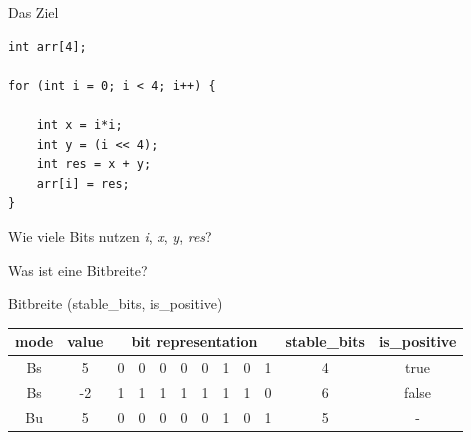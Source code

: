 
\begin{frame}[fragile]{Das Ziel}
\begin{lstlisting}
int arr[4];

for (int i = 0; i < 4; i++) {

	int x = i*i;      
	int y = (i << 4); 
	int res = x + y;  
	arr[i] = res;
}
\end{lstlisting}
Wie viele Bits nutzen \textit{i}, \textit{x}, \textit{y}, \textit{res}? \newline
\end{frame}

\begin{frame}{Was ist eine Bitbreite?}
\begin{center}
	\begin{definition}{Bitbreite}
		(stable\_bits, is\_positive)
	\end{definition}
\end{center}

\begin{tabular}{ c c | c c c c c c c c | c c }
	mode & value & \multicolumn{8}{c|}{bit representation} & stable\_bits & is\_positive \\
	\hline
	\hline
	Bs & 5     & \color{red}0 & \color {red}0 & \color{red}0 & \color{red}0 & 0 & 1 & 0 & 1 & 4 & true\\
	Bs & -2    & \color{red}1 & \color{red}1 & \color{red}1 & \color{red}1 & \color{red}1 & \color{red}1 & 1 & 0 & 6 & false\\
    Bu & 5     & \color{red}0 & \color{red}0 & \color{red}0 & \color{red}0 & \color{red}0 & 1 & 0 & 1 & 5 & - \\
\end{tabular}

\end{frame}


